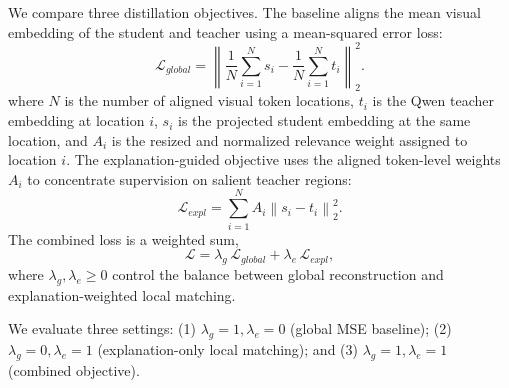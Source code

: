 We compare three distillation objectives.
The baseline aligns the mean visual embedding of the student and teacher using a mean-squared error loss:
\begin{equation}
  \mathcal{L}_{global} = \left\lVert \frac{1}{N}\sum_{i=1}^{N} s_i - \frac{1}{N}\sum_{i=1}^{N} t_i \right\rVert_2^2.
\end{equation}
where $N$ is the number of aligned visual token locations, $t_i$ is the Qwen teacher embedding at location $i$, $s_i$ is the projected student embedding at the same location, and $A_i$ is the resized and normalized relevance weight assigned to location $i$.
The explanation-guided objective uses the aligned token-level weights $A_i$ to concentrate supervision on salient teacher regions:
\begin{equation}
  \mathcal{L}_{expl} = \sum_{i=1}^{N} A_i \left\lVert s_i - t_i \right\rVert_2^2.
\end{equation}
The combined loss is a weighted sum,
\begin{equation}
  \mathcal{L} = \lambda_g\,\mathcal{L}_{global} + \lambda_e\,\mathcal{L}_{expl},
\end{equation}
where $\lambda_g, \lambda_e \ge 0$ control the balance between global reconstruction and explanation-weighted local matching. 

We evaluate three settings: (1) $\lambda_g=1, \lambda_e=0$ (global MSE baseline); (2) $\lambda_g=0, \lambda_e=1$ (explanation-only local matching); and (3) $\lambda_g=1, \lambda_e=1$ (combined objective).


